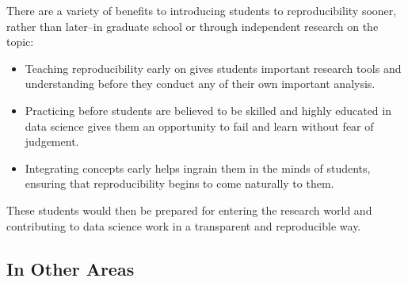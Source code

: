 \documentclass[12pt,twoside]{reedthesis}
\begin{document}
There are a variety of benefits to introducing students to reproducibility sooner, rather than later--in graduate school or through independent research on the topic:
\begin{itemize}
\item
  Teaching reproducibility early on gives students important research tools and understanding before they conduct any of their own important analysis.
\item
  Practicing before students are believed to be skilled and highly educated in data science gives them an opportunity to fail and learn without fear of judgement.
\item
  Integrating concepts early helps ingrain them in the minds of students, ensuring that reproducibility begins to come naturally to them.
\end{itemize}
These students would then be prepared for entering the research world and contributing to data science work in a transparent and reproducible way.

\hypertarget{in-other-areas}{%
\subsection{In Other Areas}\label{in-other-areas}}
\end{document}
